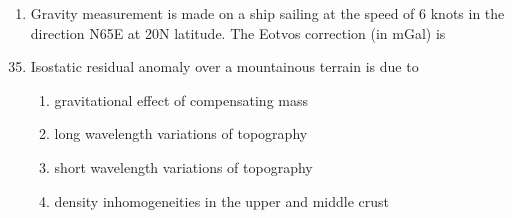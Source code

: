 \documentclass[journal,12pt,onecolumn]{IEEEtran}
\theoremstyle{remark}
\begin{document}
\begin{enumerate}
\item Gravity measurement is made on a ship sailing at the speed of 6 knots in the direction N65\textdegree{}E at 20\textdegree{}N latitude. The Eotvos correction (in mGal) is
\begin{enumerate}
\end{enumerate}

\end{enumerate}

\begin{enumerate}
\setcounter{enumi}{34}

\item Isostatic residual anomaly over a mountainous terrain is due to  
\begin{enumerate}
\item gravitational effect of compensating mass  
\item long wavelength variations of topography  
\item short wavelength variations of topography  
\item density inhomogeneities in the upper and middle crust  
\end{enumerate}

\end{enumerate}
\end{document}
